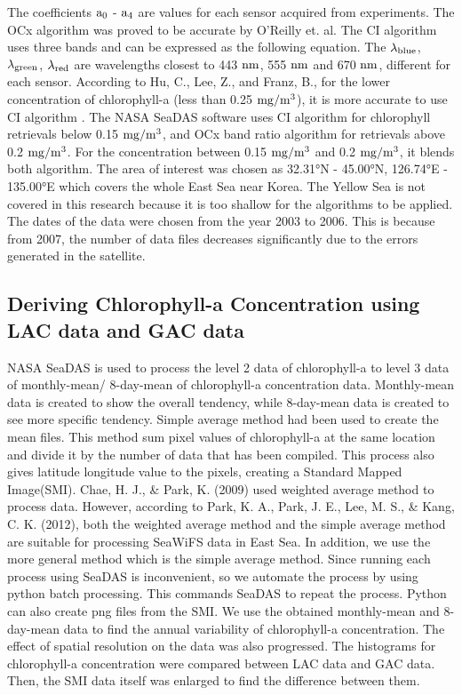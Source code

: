 The coefficients $\rm a_0$ - $\rm a_4$ are values for each sensor acquired from experiments. The OCx algorithm was proved to be accurate by O’Reilly et. al\cite{o2000ocean}. The CI algorithm uses three bands and can be expressed as the following equation.
The $\rm {\lambda}_{blue}$, $\rm {\lambda}_{green}$, $\rm {\lambda}_{red}$ are wavelengths closest to 443 $\rm nm$, 555 $\rm nm$ and 670 $\rm nm$, different for each sensor. According to Hu, C., Lee, Z., and Franz, B., for the lower concentration of chlorophyll-a (less than 0.25 $\rm mg/m^3$), it is more accurate to use CI algorithm \cite{hu2012chlorophyll}. The NASA SeaDAS software uses CI algorithm for chlorophyll retrievals below 0.15 $\rm mg/m^3$, and OCx band ratio algorithm for retrievals above 0.2 $\rm mg/m^3$. For the concentration between 0.15 $\rm mg/m^3$ and 0.2 $\rm mg/m^3$, it blends both algorithm.
The area of interest was chosen as 32.31°N - 45.00°N, 126.74°E - 135.00°E which covers the whole East Sea near Korea. The Yellow Sea is not covered in this research because it is too shallow for the algorithms to be applied. The dates of the data were chosen from the year 2003 to 2006. This is because from 2007, the number of data files decreases significantly due to the errors generated in the satellite. 


 \subsection{Deriving Chlorophyll-a Concentration using LAC data and GAC data}
 
  NASA SeaDAS is used to process the level 2 data of chlorophyll-a to level 3 data of monthly-mean/ 8-day-mean of chlorophyll-a concentration data. Monthly-mean data is created to show the overall tendency, while 8-day-mean data is created to see more specific tendency. Simple average method had been used to create the mean files. This method sum pixel values of chlorophyll-a at the same location and divide it by the number of data that has been compiled. This process also gives latitude longitude value to the pixels, creating a Standard Mapped Image(SMI). Chae, H. J., & Park, K. (2009) used weighted average method to process data. However, according to Park, K. A., Park, J. E., Lee, M. S., & Kang, C. K. (2012), both the weighted average method and the simple average method are suitable for processing SeaWiFS data in East Sea. In addition, we use the more general method which is the simple average method.
 Since running each process using SeaDAS is inconvenient, so we automate the process by using python batch processing. This commands SeaDAS to repeat the process. Python can also create png files from the SMI. We use the obtained monthly-mean and 8-day-mean data to find the annual variability of chlorophyll-a concentration.
 The effect of spatial resolution on the data was also progressed. The histograms for chlorophyll-a concentration were compared between LAC data and GAC data. Then, the SMI data itself was enlarged to find the difference between them.
 